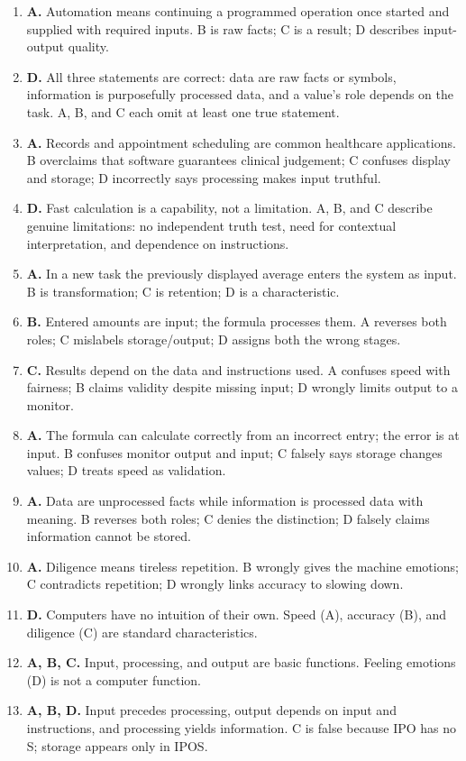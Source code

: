 \documentclass[11pt]{article}
\begin{document}
\begin{enumerate}[label=\textbf{Q\arabic*.}, leftmargin=*]
  different programs. A is tireless repetition; C is retention; D is a
  result/stage.
\item \textbf{A.} Automation means continuing a programmed operation once
  started and supplied with required inputs. B is raw facts; C is a result;
  D describes input-output quality.
\item \textbf{D.} All three statements are correct: data are raw facts or
  symbols, information is purposefully processed data, and a value's role
  depends on the task. A, B, and C each omit at least one true statement.
\item \textbf{A.} Records and appointment scheduling are common healthcare
  applications. B overclaims that software guarantees clinical judgement; C
  confuses display and storage; D incorrectly says processing makes input
  truthful.
\item \textbf{D.} Fast calculation is a capability, not a limitation. A, B,
  and C describe genuine limitations: no independent truth test, need for
  contextual interpretation, and dependence on instructions.
\item \textbf{A.} In a new task the previously displayed average enters the
  system as input. B is transformation; C is retention; D is a characteristic.
\item \textbf{B.} Entered amounts are input; the formula processes them. A
  reverses both roles; C mislabels storage/output; D assigns both the wrong
  stages.
\item \textbf{C.} Results depend on the data and instructions used. A
  confuses speed with fairness; B claims validity despite missing input; D
  wrongly limits output to a monitor.
\item \textbf{A.} The formula can calculate correctly from an incorrect
  entry; the error is at input. B confuses monitor output and input; C
  falsely says storage changes values; D treats speed as validation.

\item \textbf{A.} Data are unprocessed facts while information is processed data with meaning. B reverses both roles; C denies the distinction; D falsely claims information cannot be stored.
\item \textbf{A.} Diligence means tireless repetition. B wrongly gives the machine emotions; C contradicts repetition; D wrongly links accuracy to slowing down.
\item \textbf{D.} Computers have no intuition of their own. Speed (A), accuracy (B), and diligence (C) are standard characteristics.
\item \textbf{A, B, C.} Input, processing, and output are basic functions. Feeling emotions (D) is not a computer function.
\item \textbf{A, B, D.} Input precedes processing, output depends on input and instructions, and processing yields information. C is false because IPO has no S; storage appears only in IPOS.
\end{enumerate}
\def\JKSSBLessonID{1}\def\JKSSBAnswers{1}
\end{document}
